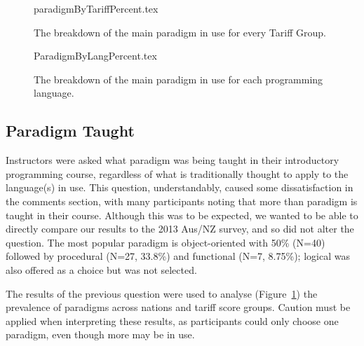 \documentclass{sig-alternate}
\begin{document}

\begin{figure}[ht]\vskip-12pt
\begin{center}
{paradigmByTariffPercent.tex}
\end{center}\vskip-18pt
\caption{The breakdown of the main paradigm in use for every Tariff Group.\label{fig:paradigmTariff}}
\end{figure}

\begin{figure}
\begin{center}
{ParadigmByLangPercent.tex}
\end{center}\vskip-18pt
\caption{The breakdown of the main paradigm in use for each programming language.\label{fig:paradigmLang}}
\end{figure}
\subsection{Paradigm Taught}

Instructors were asked what paradigm was being taught in their
introductory programming course, regardless of what is traditionally
thought to apply to the language(s) in use. This question,
understandably, caused some dissatisfaction in the comments section,
with many participants noting that more than paradigm is taught in
their course. Although this was to be expected, we wanted to be able
to directly compare our results to the 2013 Aus/NZ survey, and so did
not alter the question. The most popular paradigm is object-oriented
with 50\% (N=40) followed by procedural (N=27, 33.8\%) and functional
(N=7, 8.75\%); logical was also offered as a choice but was not
selected.

The results of the previous question were used to analyse
(Figure~\ref{fig:paradigmTariff}) the prevalence of paradigms across
nations and tariff score groups. Caution must be applied when
interpreting these results, as participants could only choose one
paradigm, even though more may be in use.
\end{document}
